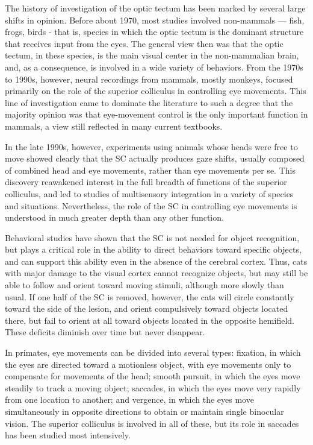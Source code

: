 \documentclass[]{book}
\begin{document}
The history of investigation of the optic tectum has been marked by several large shifts in opinion. Before about 1970, most studies involved non-mammals --- fish, frogs, birds - that is, species in which the optic tectum is the dominant structure that receives input from the eyes. The general view then was that the optic tectum, in these species, is the main visual center in the non-mammalian brain, and, as a consequence, is involved in a wide variety of behaviors. From the 1970s to 1990s, however, neural recordings from mammals, mostly monkeys, focused primarily on the role of the superior colliculus in controlling eye movements. This line of investigation came to dominate the literature to such a degree that the majority opinion was that eye-movement control is the only important function in mammals, a view still reflected in many current textbooks.

In the late 1990s, however, experiments using animals whose heads were free to move showed clearly that the SC actually produces gaze shifts, usually composed of combined head and eye movements, rather than eye movements per se. This discovery reawakened interest in the full breadth of functions of the superior colliculus, and led to studies of multisensory integration in a variety of species and situations. Nevertheless, the role of the SC in controlling eye movements is understood in much greater depth than any other function.

Behavioral studies have shown that the SC is not needed for object recognition, but plays a critical role in the ability to direct behaviors toward specific objects, and can support this ability even in the absence of the cerebral cortex. Thus, cats with major damage to the visual cortex cannot recognize objects, but may still be able to follow and orient toward moving stimuli, although more slowly than usual. If one half of the SC is removed, however, the cats will circle constantly toward the side of the lesion, and orient compulsively toward objects located there, but fail to orient at all toward objects located in the opposite hemifield. These deficits diminish over time but never disappear.

In primates, eye movements can be divided into several types: fixation, in which the eyes are directed toward a motionless object, with eye movements only to compensate for movements of the head; smooth pursuit, in which the eyes move steadily to track a moving object; saccades, in which the eyes move very rapidly from one location to another; and vergence, in which the eyes move simultaneously in opposite directions to obtain or maintain single binocular vision. The superior colliculus is involved in all of these, but its role in saccades has been studied most intensively.
\end{document}
